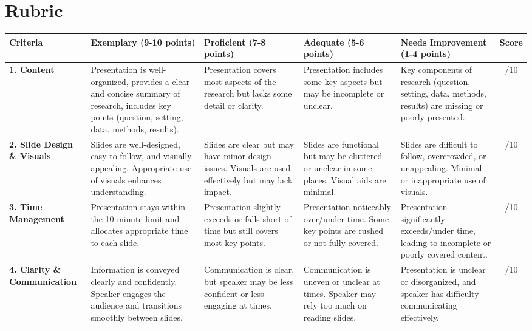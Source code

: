 \documentclass[
]{article}
\begin{document}
\hypertarget{rubric}{%
\section{Rubric}\label{rubric}}

\begin{tabular}{| p{2.1cm} | p{3.2cm} | p{3.2cm} | p{3.2cm} | p{3.2cm} | c |}
    \hline
    \textbf{Criteria} & \textbf{Exemplary (9-10 points)} & \textbf{Proficient (7-8 points)} & \textbf{Adequate (5-6 points)} & \textbf{Needs Improvement (1-4 points)} & \textbf{Score} \\
    \hline
    \textbf{1. Content} & Presentation is well-organized, provides a clear and concise summary of research, includes key points (question, setting, data, methods, results). & Presentation covers most aspects of the research but lacks some detail or clarity. & Presentation includes some key aspects but may be incomplete or unclear. & Key components of research (question, setting, data, methods, results) are missing or poorly presented. & /10 \\
    \hline
    \textbf{2. Slide Design \& Visuals} & Slides are well-designed, easy to follow, and visually appealing. Appropriate use of visuals enhances understanding. & Slides are clear but may have minor design issues. Visuals are used effectively but may lack impact. & Slides are functional but may be cluttered or unclear in some places. Visual aids are minimal. & Slides are difficult to follow, overcrowded, or unappealing. Minimal or inappropriate use of visuals. & /10 \\
    \hline
    \textbf{3. Time Management} & Presentation stays within the 10-minute limit and allocates appropriate time to each slide. & Presentation slightly exceeds or falls short of time but still covers most key points. & Presentation noticeably over/under time. Some key points are rushed or not fully covered. & Presentation significantly exceeds/under time, leading to incomplete or poorly covered content. & /10 \\
    \hline
    \textbf{4. Clarity \& Communication} & Information is conveyed clearly and confidently. Speaker engages the audience and transitions smoothly between slides. & Communication is clear, but speaker may be less confident or less engaging at times. & Communication is uneven or unclear at times. Speaker may rely too much on reading slides. & Presentation is unclear or disorganized, and speaker has difficulty communicating effectively. & /10 \\
    \hline

\end{tabular}
\end{document}
